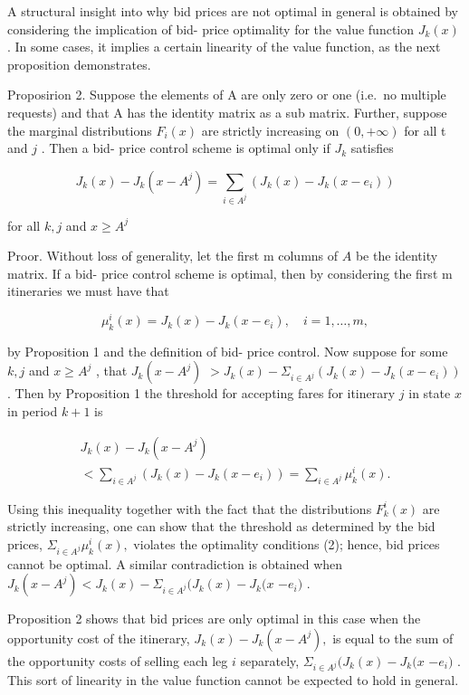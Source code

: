 A structural insight into why bid prices are not optimal in general is
obtained by considering the implication of bid- price optimality for the
value function \(J_{k}(x)\) . In some cases, it implies a certain
linearity of the value function, as the next proposition demonstrates.

Proposirion 2. Suppose the elements of A are only zero or one (i.e.~no
multiple requests) and that A has the identity matrix as a sub matrix.
Further, suppose the marginal distributions \(F_{i}(x)\) are strictly
increasing on \((0, + \infty)\) for all t and \(j\) . Then a bid- price
control scheme is optimal only if \(J_{k}\) satisfies

\[
J_{k}(x) - J_{k}(x - A^{j}) = \sum_{i\in A^{j}}(J_{k}(x) - J_{k}(x - e_{i}))
\]

for all \(k,j\) and \(x\geq A^{j}\)

Proor. Without loss of generality, let the first m columns of \(A\) be
the identity matrix. If a bid- price control scheme is optimal, then by
considering the first m itineraries we must have that

\[
\mu_{k}^{i}(x) = J_{k}(x) - J_{k}(x - e_{i}),\quad i = 1,\ldots ,m,
\]

by Proposition 1 and the definition of bid- price control. Now suppose
for some \(k,j\) and \(x\geq A^{j}\) , that \(J_{k}(x - A^{j})\)
\(>J_{k}(x) - \Sigma_{i\in A^{j}}(J_{k}(x) - J_{k}(x - e_{i}))\) . Then
by Proposition 1 the threshold for accepting fares for itinerary \(j\)
in state \(x\) in period \(k + 1\) is

\[
\begin{array}{l}{{J_{k}(x)-J_{k}(x-A^{j})}}\\ {{< \sum_{i\in A^{j}}(J_{k}(x)-J_{k}(x-e_{i}))=\sum_{i\in A^{j}}\mu_{k}^{i}(x).}}\end{array}
\]

Using this inequality together with the fact that the distributions
\(F_{k}^{i}(x)\) are strictly increasing, one can show that the
threshold as determined by the bid prices,
\(\Sigma_{i\in A^{j}}\mu_{k}^{i}(x),\) violates the optimality
conditions (2); hence, bid prices cannot be optimal. A similar
contradiction is obtained when
\(J_{k}(x - A^{j})< J_{k}(x) - \Sigma_{i\in A^{j}}(J_{k}(x) - J_{k}(x\)
\(- e_{i})\) .

Proposition 2 shows that bid prices are only optimal in this case when
the opportunity cost of the itinerary, \(J_{k}(x) - J_{k}(x - A^{j}),\)
is equal to the sum of the opportunity costs of selling each leg \(i\)
separately, \(\Sigma_{i\in A^{j}}(J_{k}(x) - J_{k}(x\) \(- e_{i})\) .
This sort of linearity in the value function cannot be expected to hold
in general.

